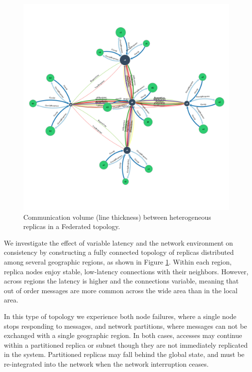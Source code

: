 \documentclass[10pt,conference,letterpaper]{IEEEtran}
\begin{document}
\begin{figure}
    \centering
      \includegraphics[width=\linewidth]{figures/federated_sync}
    \caption{Communication volume (line thickness) between  heterogeneous replicas in a Federated topology.}
    \label{fig:topology}
\end{figure}

We investigate the effect of variable latency and the network environment on consistency by
constructing a fully connected topology of replicas distributed among several 
geographic regions, as shown in Figure \ref{fig:topology}.
Within each region, replica nodes enjoy stable, low-latency connections with their
neighbors.
However, across regions the latency is higher and the connections variable, meaning that
out of order messages are more common across the wide area than in the local area.

In this type of topology we experience both
node failures, where a single node stops responding to
messages, and network partitions, where messages can not be exchanged
with a single geographic region.
In both cases, accesses may continue within a partitioned replica or subnet
though they are not immediately replicated in the system.
Partitioned replicas may fall behind the global state, and must be
re-integrated into the network when the network interruption ceases.
\end{document}

